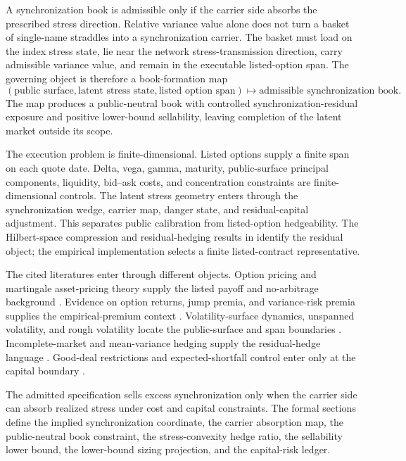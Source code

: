 \documentclass[11pt,a4paper]{amsart}
\theoremstyle{plain}
\theoremstyle{definition}
\theoremstyle{remark}
\begin{document}
A synchronization book is admissible only if the carrier side absorbs the prescribed stress
direction.  Relative variance value alone does not turn a basket of single-name straddles into a
synchronization carrier.  The basket must load on the index stress state, lie near the network
stress-transmission direction, carry admissible variance value, and remain in the executable
listed-option span.  The governing object is therefore a book-formation map
\[
        (\text{public surface},\text{latent stress state},\text{listed option span})
        \longmapsto
        \text{admissible synchronization book}.
\]
The map produces a public-neutral book with controlled synchronization-residual exposure and
positive lower-bound sellability, leaving completion of the latent market outside its scope.

The execution problem is finite-dimensional.  Listed options supply a finite span on each quote date.
Delta, vega, gamma, maturity, public-surface principal components, liquidity, bid--ask costs, and
concentration constraints are finite-dimensional controls.  The latent stress geometry enters
through the synchronization wedge, carrier map, danger state, and residual-capital adjustment.
This separates public calibration from listed-option hedgeability.  The Hilbert-space compression
and residual-hedging results in \cite{vidal2026compression,vidal2026pricing} identify the residual
object; the empirical implementation selects a finite listed-contract representative.

The cited literatures enter through different objects.  Option pricing and martingale asset-pricing
theory supply the listed payoff and no-arbitrage background
\cite{blackScholes1973,merton1973,harrisonPliska1981}.  Evidence on option returns, jump premia,
and variance-risk premia supplies the empirical-premium context
\cite{covalShumway2001,bakshiKapadia2003,pan2002,carrWu2009}.  Volatility-surface dynamics,
unspanned volatility, and rough volatility locate the public-surface and span boundaries
\cite{contDaFonseca2002,trolleSchwartz2009,gatheralJaissonRosenbaum2018}.  Incomplete-market and
mean-variance hedging supply the residual-hedge language
\cite{follmerSchweizer1991,schweizer1992meanVariance}.  Good-deal restrictions and
expected-shortfall control enter only at the capital boundary
\cite{cochraneSaaRequejo2000,rockafellarUryasev2000}.

The admitted specification sells excess synchronization only when the carrier side can absorb realized
stress under cost and capital constraints.  The formal sections define the implied
synchronization coordinate, the carrier absorption map, the public-neutral book constraint, the
stress-convexity hedge ratio, the sellability lower bound, the lower-bound sizing projection, and
the capital-risk ledger.
\end{document}

